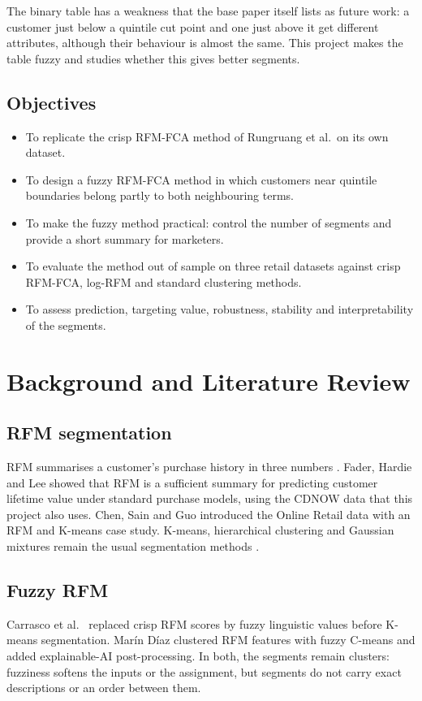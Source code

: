 \documentclass[11pt,a4paper]{article}
\begin{document}
The binary table has a weakness that the base paper itself lists as future work: a customer just below a quintile cut point and one just above it get different attributes, although their behaviour is almost the same. This project makes the table fuzzy and studies whether this gives better segments.

\subsection{Objectives}
\begin{itemize}
\item To replicate the crisp RFM-FCA method of Rungruang et al.\ on its own dataset.
\item To design a fuzzy RFM-FCA method in which customers near quintile boundaries belong partly to both neighbouring terms.
\item To make the fuzzy method practical: control the number of segments and provide a short summary for marketers.
\item To evaluate the method out of sample on three retail datasets against crisp RFM-FCA, log-RFM and standard clustering methods.
\item To assess prediction, targeting value, robustness, stability and interpretability of the segments.
\end{itemize}

\newpage
\section{Background and Literature Review}

\subsection{RFM segmentation}
RFM summarises a customer's purchase history in three numbers \cite{hughes1994}. Fader, Hardie and Lee \cite{fader2005} showed that RFM is a sufficient summary for predicting customer lifetime value under standard purchase models, using the CDNOW data that this project also uses. Chen, Sain and Guo \cite{chen2012} introduced the Online Retail data with an RFM and K-means case study. K-means, hierarchical clustering and Gaussian mixtures remain the usual segmentation methods \cite{wedel2000}.

\subsection{Fuzzy RFM}
Carrasco et al.\ \cite{carrasco2019} replaced crisp RFM scores by fuzzy linguistic values before K-means segmentation. Marín Díaz \cite{marindiaz2025} clustered RFM features with fuzzy C-means \cite{bezdek1981} and added explainable-AI post-processing. In both, the segments remain clusters: fuzziness softens the inputs or the assignment, but segments do not carry exact descriptions or an order between them.
\end{document}
